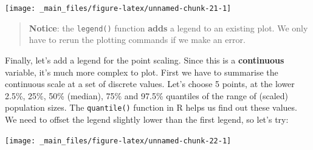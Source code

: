 \documentclass[]{book}
\newenvironment{Shaded}{\begin{snugshade}}{\end{snugshade}}
\newcommand{\KeywordTok}[1]{\textcolor[rgb]{0.13,0.29,0.53}{\textbf{{#1}}}}
\newcommand{\DataTypeTok}[1]{\textcolor[rgb]{0.13,0.29,0.53}{{#1}}}
\newcommand{\DecValTok}[1]{\textcolor[rgb]{0.00,0.00,0.81}{{#1}}}
\newcommand{\FloatTok}[1]{\textcolor[rgb]{0.00,0.00,0.81}{{#1}}}
\newcommand{\StringTok}[1]{\textcolor[rgb]{0.31,0.60,0.02}{{#1}}}
\newcommand{\NormalTok}[1]{{#1}}
\theoremstyle{definition}
\theoremstyle{definition}
\theoremstyle{definition}
\theoremstyle{remark}
\begin{document}
\begin{center}\texttt{[image: \_main\_files/figure-latex/unnamed-chunk-21-1]} \end{center}

\begin{quote}
\textbf{Notice}: the \texttt{legend()} function \textbf{adds} a legend
to an existing plot. We only have to rerun the plotting commands if we
make an error.
\end{quote}

Finally, let's add a legend for the point scaling. Since this is a
\textbf{continuous} variable, it's much more complex to plot. First we
have to summarise the continuous scale at a set of discrete values.
Let's choose 5 points, at the lower 2.5\%, 25\%, 50\% (median), 75\% and
97.5\% quantiles of the range of (scaled) population sizes. The
\texttt{quantile()} function in R helps us find out these values. We
need to offset the legend slightly lower than the first legend, so let's
try:

\begin{Shaded}
\end{Shaded}

\begin{center}\texttt{[image: \_main\_files/figure-latex/unnamed-chunk-22-1]} \end{center}
\end{document}
